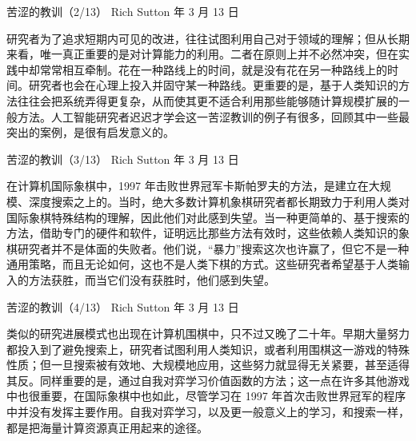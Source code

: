 \documentclass[UTF8,aspectratio=169,11pt,fontset=none]{ctexbeamer}
\begin{document}
\begin{frame}[t]{苦涩的教训（2/13）}
\relax
{\small\color{accent}Rich Sutton 年 3 月 13 日}\par
\vspace{0.22cm}
\begingroup
\fontsize{12}{20}\selectfont
研究者为了追求短期内可见的改进，往往试图利用自己对于领域的理解；但从长期来看，唯一真正重要的是对计算能力的利用。二者在原则上并不必然冲突，但在实践中却常常相互牵制。花在一种路线上的时间，就是没有花在另一种路线上的时间。研究者也会在心理上投入并固守某一种路线。更重要的是，基于人类知识的方法往往会把系统弄得更复杂，从而使其更不适合利用那些能够随计算规模扩展的一般方法。人工智能研究者迟迟才学会这一苦涩教训的例子有很多，回顾其中一些最突出的案例，是很有启发意义的。
\par\endgroup
\end{frame}

\begin{frame}[t]{苦涩的教训（3/13）}
\relax
{\small\color{accent}Rich Sutton 年 3 月 13 日}\par
\vspace{0.22cm}
\begingroup
\fontsize{12}{20}\selectfont
在计算机国际象棋中，1997 年击败世界冠军卡斯帕罗夫的方法，是建立在大规模、深度搜索之上的。当时，绝大多数计算机象棋研究者都长期致力于利用人类对国际象棋特殊结构的理解，因此他们对此感到失望。当一种更简单的、基于搜索的方法，借助专门的硬件和软件，证明远比那些方法有效时，这些依赖人类知识的象棋研究者并不是体面的失败者。他们说，“暴力”搜索这次也许赢了，但它不是一种通用策略，而且无论如何，这也不是人类下棋的方式。这些研究者希望基于人类输入的方法获胜，而当它们没有获胜时，他们感到失望。
\par\endgroup
\end{frame}

\begin{frame}[t]{苦涩的教训（4/13）}
\relax
{\small\color{accent}Rich Sutton 年 3 月 13 日}\par
\vspace{0.22cm}
\begingroup
\fontsize{12}{20}\selectfont
类似的研究进展模式也出现在计算机围棋中，只不过又晚了二十年。早期大量努力都投入到了避免搜索上，研究者试图利用人类知识，或者利用围棋这一游戏的特殊性质；但一旦搜索被有效地、大规模地应用，这些努力就显得无关紧要，甚至适得其反。同样重要的是，通过自我对弈学习价值函数的方法；这一点在许多其他游戏中也很重要，在国际象棋中也如此，尽管学习在 1997 年首次击败世界冠军的程序中并没有发挥主要作用。自我对弈学习，以及更一般意义上的学习，和搜索一样，都是把海量计算资源真正用起来的途径。
\par\endgroup
\end{frame}
\end{document}
